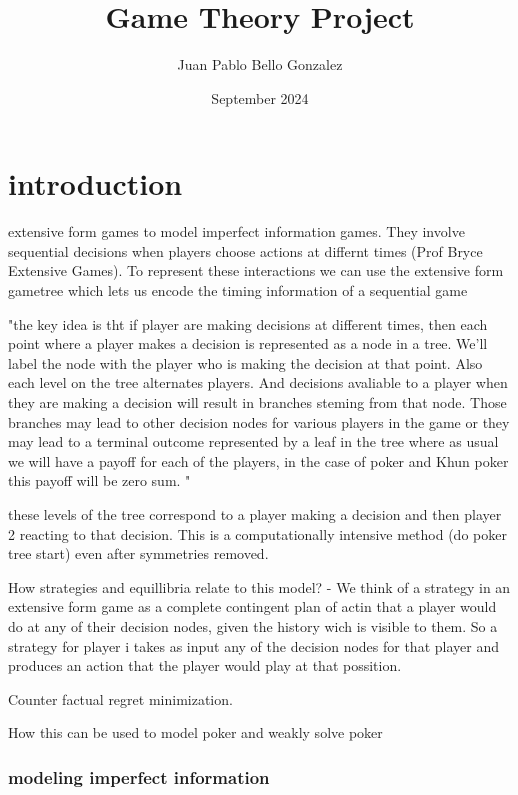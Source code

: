 \documentclass{article}
\title{Game Theory Project}
\author{Juan Pablo Bello Gonzalez}
\date{September 2024}
\begin{document}
\maketitle

\section{introduction}

extensive form games to model imperfect information games. They involve sequential decisions when players choose actions at differnt times (Prof Bryce Extensive Games).
To represent these interactions we can use the extensive form gametree which lets us encode the timing information of a sequential game

"the key idea is tht if player are making decisions at different times, then each point where a player makes a decision is represented as a node in a tree. We'll label the node with the player who is making the decision at that point. Also each level on the tree alternates players. And decisions avaliable to a player when they are making a decision will result in branches steming from that node. Those branches may lead to other decision nodes for various players in the game or they may lead to a terminal outcome represented by a leaf in the tree where as usual we will have a payoff for each of the players, in the case of poker and Khun poker this payoff will be zero sum. "

these levels of the tree correspond to a player making a decision and then player 2 reacting to that decision. This is a computationally intensive method (do poker tree start) even after symmetries removed. 

How strategies and equillibria relate to this model?
- We think of a strategy in an extensive form game as a complete contingent plan of actin that a player would do at any of their decision nodes, given the history wich is visible to them. 
So a strategy for player i takes as input any of the decision nodes for that player and produces an action that the player would play at that possition. 


Counter factual regret minimization. 

How this can be used to model poker and weakly solve poker 


\subsubsection{modeling imperfect information}
\end{document}
